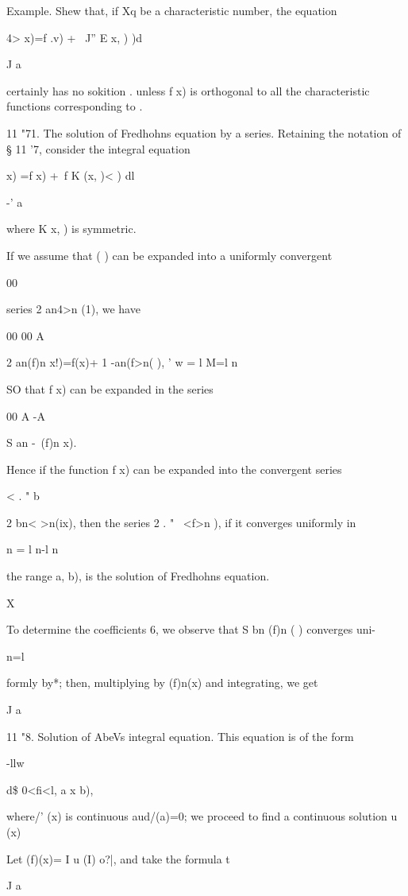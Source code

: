 {Example. Shew that, if Xq be a characteristic number, the equation

4> x)=f .v) + \ J'' E x, ) )d

J a

certainly has no sokition . unless f x) is orthogonal to all the
characteristic functions corresponding to .

11 "71. The solution of Fredhohns equation by a series. Retaining the
notation of § 11 '7, consider the integral equation

   x) =f x) +\ f K (x, )< ) dl

-' a

where K x, ) is symmetric.

If we assume that ( ) can be expanded into a uniformly convergent

00

series 2 an4>n (1), we have

00 00 A

2 an(f)n x!)=f(x)+ 1 -an(f>n( ), ' w = l M=l n

SO that f x) can be expanded in the series

00 A -A

S an -\ (f)n x).

Hence if the function f x) can be expanded into the convergent series

< . " b \

2 bn< >n(ix), then the series 2 . " \ <f>n ), if it converges
uniformly in

n = l n-l n

the range a, b), is the solution of Fredhohns equation.

%
%

X

To determine the coefficients 6, we observe that S bn (f)n ( )
converges uni-

n=l

formly by*; then, multiplying by (f)n(x) and integrating, we
get

J a

11 "8. Solution of AbeVs integral equation. This equation is of the
form

  -llw

d\$ 0<fi<l, a x b),

where/' (x) is continuous aud/(a)=0; we proceed to find a continuous
solution u (x)

Let (f)(x)= I u (I) o?|, and take the formula t

J a

}
